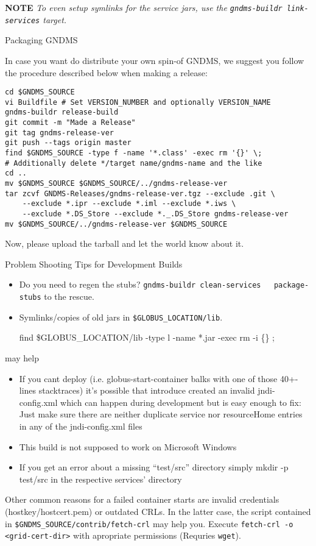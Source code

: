 \documentclass{article}
\begin{document}
\textbf{NOTE}
\emph{To even setup symlinks for the service jars, use the \texttt{gndms-buildr link-services} target.}

Packaging GNDMS

In case you want do distribute your own spin-of GNDMS, we suggest
you follow the procedure described below when making a release:

\begin{verbatim}
cd $GNDMS_SOURCE
vi Buildfile # Set VERSION_NUMBER and optionally VERSION_NAME
gndms-buildr release-build
git commit -m "Made a Release"
git tag gndms-release-ver
git push --tags origin master
find $GNDMS_SOURCE -type f -name '*.class' -exec rm '{}' \;
# Additionally delete */target name/gndms-name and the like
cd ..
mv $GNDMS_SOURCE $GNDMS_SOURCE/../gndms-release-ver
tar zcvf GNDMS-Releases/gndms-release-ver.tgz --exclude .git \
    --exclude *.ipr --exclude *.iml --exclude *.iws \
    --exclude *.DS_Store --exclude *._.DS_Store gndms-release-ver
mv $GNDMS_SOURCE/../gndms-release-ver $GNDMS_SOURCE
\end{verbatim}

Now, please upload the tarball and let the world know about it.

Problem Shooting Tips for Development Builds

\begin{itemize}
\item
  Do you need to regen the stubs?
  \verb!gndms-buildr clean-services   package-stubs! to the rescue.

\item
  Symlinks/copies of old jars in \verb!$GLOBUS_LOCATION/lib!.

  find \$GLOBUS\_LOCATION/lib -type l -name *.jar -exec rm -i \{\} ;

\end{itemize}
may help

\begin{itemize}
\item
  If you cant deploy (i.e. globus-start-container balks with one of
  those 40+-lines stacktraces) it's possible that introduce created
  an invalid jndi-config.xml which can happen during development but
  is easy enough to fix: Just make sure there are neither duplicate
  service nor resourceHome entries in any of the jndi-config.xml
  files

\item
  This build is not supposed to work on Microsoft Windows

\item
  If you get an error about a missing ``test/src'' directory simply
  mkdir -p test/src in the respective services' directory

\end{itemize}
Other common reasons for a failed container starts are invalid
credentials (hostkey/hostcert.pem) or outdated CRLs. In the latter
case, the script contained in
\verb!$GNDMS_SOURCE/contrib/fetch-crl! may help you. Execute
\verb!fetch-crl -o <grid-cert-dir>! with apropriate permissions
(Requries \verb!wget!).
\end{document}
